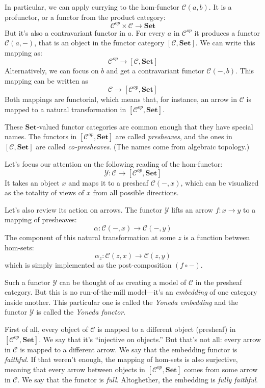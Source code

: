\documentclass[DaoFP]{subfiles}
\begin{document}
In particular, we can apply currying to the hom-functor $\mathcal{C}(a, b)$. It is a profunctor, or a functor from the product category:
\[ \mathcal{C}^{op} \times \mathcal{C} \to  \mathbf{Set} \]
But it's also a contravariant functor in $a$. For every $a$ in  $\mathcal{C}^{op}$  it produces a functor $\mathcal{C}(a, -)$, that is an object in the functor category $ [\mathcal{C},  \mathbf{Set}] $. We can write this mapping as:
\[ \mathcal{C}^{op} \to [\mathcal{C},  \mathbf{Set}] \]
Alternatively, we can focus on $b$ and get a contravariant functor $\mathcal{C}(-, b)$. This mapping can be written as
\[ \mathcal{C} \to [\mathcal{C}^{op},  \mathbf{Set}] \]
Both mappings are functorial, which means that, for instance, an arrow in $\mathcal{C}$ is mapped to a natural transformation in $[\mathcal{C}^{op},  \mathbf{Set}]$.

These $\mathbf{Set}$-valued functor categories are common enough that they have special names. The functors in $[\mathcal{C}^{op},  \mathbf{Set}]$ are called \emph{presheaves}, and the ones in $[\mathcal{C},  \mathbf{Set}]$ are called \emph{co-presheaves}. (The names come from algebraic topology.)

Let's focus our attention on the following reading of the hom-functor:
\[ \mathcal{Y} \colon \mathcal{C} \to [\mathcal{C}^{op},  \mathbf{Set}] \]
It takes an object $x$ and maps it to a presheaf $\mathcal{C}(-, x)$, which can be visualized as the totality of views of $x$ from all possible directions.

Let's also review its action on arrows. The functor $\mathcal{Y}$ lifts an arrow $f \colon x \to y$ to a mapping of presheaves:
\[ \alpha \colon \mathcal{C}(-, x) \to \mathcal{C}(-, y) \]
The component of this natural transformation at some $z$ is a function between hom-sets:
\[ \alpha_z \colon \mathcal{C}(z, x) \to \mathcal{C}(z, y) \]
which is simply implemented as the post-composition $(f \circ -)$.

Such a functor $\mathcal{Y}$ can be thought of as creating a model of $\mathcal{C}$ in the presheaf category. But this is no run-of-the-mill model---it's an \emph{embedding} of one category inside another. This particular one is called the \emph{Yoneda embedding} and the functor $\mathcal{Y}$ is called the \emph{Yoneda functor}. 

First of all, every object of $\mathcal{C}$ is mapped to a different object (presheaf) in $[\mathcal{C}^{op},  \mathbf{Set}]$. We say that it's ``injective on objects.'' But that's not all: every arrow in $\mathcal{C}$ is mapped to a different arrow. We say that the embedding functor is \emph{faithful}. If that weren't enough, the mapping of hom-sets is also surjective, meaning that every arrow between objects in $[\mathcal{C}^{op},  \mathbf{Set}]$ comes from some arrow in $\mathcal{C}$. We say that the functor is \emph{full}. Altoghether, the embedding is \emph{fully faithful}.
\end{document}
